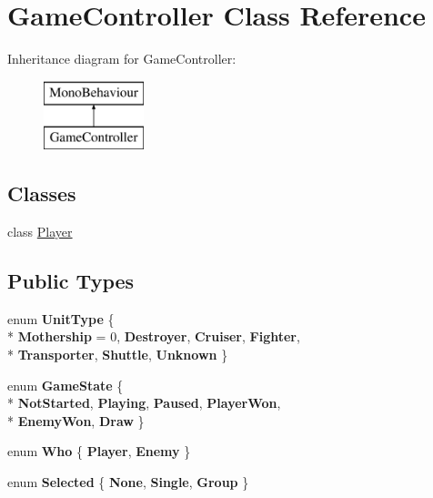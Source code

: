 \hypertarget{class_game_controller}{}\section{Game\+Controller Class Reference}
\label{class_game_controller}
Inheritance diagram for Game\+Controller\+:\begin{figure}[H]
\begin{center}
\leavevmode
\includegraphics[height=2.000000cm]{class_game_controller}
\end{center}
\end{figure}
\subsection*{Classes}
\begin{DoxyCompactItemize}
\item 
class \hyperlink{class_game_controller_1_1_player}{Player}
\end{DoxyCompactItemize}
\subsection*{Public Types}
\begin{DoxyCompactItemize}
\item 
\hypertarget{class_game_controller_ab937754651a2f755bd6ae099c7a43a10}{}enum {\bfseries Unit\+Type} \{ \\*
{\bfseries Mothership} = 0, 
{\bfseries Destroyer}, 
{\bfseries Cruiser}, 
{\bfseries Fighter}, 
\\*
{\bfseries Transporter}, 
{\bfseries Shuttle}, 
{\bfseries Unknown}
 \}\label{class_game_controller_ab937754651a2f755bd6ae099c7a43a10}

\item 
\hypertarget{class_game_controller_a532443f5d4c5992fecce2943dc627a89}{}enum {\bfseries Game\+State} \{ \\*
{\bfseries Not\+Started}, 
{\bfseries Playing}, 
{\bfseries Paused}, 
{\bfseries Player\+Won}, 
\\*
{\bfseries Enemy\+Won}, 
{\bfseries Draw}
 \}\label{class_game_controller_a532443f5d4c5992fecce2943dc627a89}

\item 
\hypertarget{class_game_controller_a2c93703a2af5124f070ee30361edd812}{}enum {\bfseries Who} \{ {\bfseries Player}, 
{\bfseries Enemy}
 \}\label{class_game_controller_a2c93703a2af5124f070ee30361edd812}

\item 
\hypertarget{class_game_controller_a3545f5a2e68f44c964b88e3cbb0fa6a9}{}enum {\bfseries Selected} \{ {\bfseries None}, 
{\bfseries Single}, 
{\bfseries Group}
 \}\label{class_game_controller_a3545f5a2e68f44c964b88e3cbb0fa6a9}

\end{DoxyCompactItemize}
